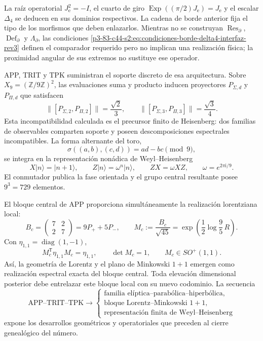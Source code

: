 \begin{remark}
La raíz operatorial \(J_{\mathrm e}^2=-I\), el cuarto de giro
\(\operatorname{Exp}((\pi/2)J_{\mathrm e})=J_{\mathrm e}\) y el escalar
\(\Delta_4\) se deducen en sus dominios respectivos. La cadena de borde
anterior fija el tipo de los morfismos que deben enlazarlos. Mientras no se
construyan
\(\operatorname{Res}_{\partial}\), \(\operatorname{Def}_{\partial}\) y
\(\Lambda_{\partial}\), las condiciones
\eqref{p3-83-c44-s2:eq:condiciones-borde-delta4-interfaz-rev3} definen el comparador
requerido pero no implican una realización física; la proximidad angular de
sus extremos no sustituye ese operador.
\end{remark}

APP, TRIT y TPK suministran el soporte discreto de esa arquitectura. Sobre
\(X_9=(\mathbb Z/9\mathbb Z)^2\), las evaluaciones suma y producto inducen
proyectores \(P_{\Sigma,d}\) y \(P_{\Pi,d}\) que satisfacen
\[
 \|[P_{\Sigma,2},P_{\Pi,2}]\|=\frac{\sqrt2}{3},
 \qquad
 \|[P_{\Sigma,3},P_{\Pi,3}]\|=\frac{\sqrt3}{4}.
\]
Esta incompatibilidad calculada es el precursor finito de Heisenberg: dos
familias de observables comparten soporte y poseen descomposiciones
espectrales incompatibles. La forma alternante del toro,
\[
 \sigma((a,b),(c,d))=ad-bc\pmod9,
\]
se integra en la representación nonádica de Weyl--Heisenberg
\[
 X|n\rangle=|n+1\rangle,\qquad
 Z|n\rangle=\omega^n|n\rangle,\qquad
 ZX=\omega XZ,
 \qquad \omega=e^{2\pi\mathrm i/9}.
\]
El conmutador publica la fase orientada y el grupo central resultante posee
\(9^3=729\) elementos.

El bloque central de APP proporciona simultáneamente la realización
lorentziana local:
\[
 B_c=
 \begin{pmatrix}7&2\\2&7\end{pmatrix}
 =9P_++5P_-,
 \qquad
 M_c:=\frac{B_c}{\sqrt{45}}
 =\exp\!\left(\frac12\log\frac95\,R\right).
\]
Con \(\eta_{1,1}=\operatorname{diag}(1,-1)\),
\[
 M_c^{\mathsf T}\eta_{1,1}M_c=\eta_{1,1},
 \qquad
 \det M_c=1,
 \qquad
 M_c\in SO^+(1,1).
\]
Así, la geometría de Lorentz y el plano de Minkowski \(1+1\) emergen como
realización espectral exacta del bloque central. Toda elevación dimensional
posterior debe entrelazar este bloque local con su nuevo codominio. La secuencia
\[
 \boxed{
 \text{APP--TRIT--TPK}
 \longrightarrow
 \begin{cases}
 \text{familia elíptica--parabólica--hiperbólica},\\
 \text{bloque Lorentz--Minkowski }1+1,\\
 \text{representación finita de Weyl--Heisenberg}
 \end{cases}}
\]
expone los desarrollos geométricos y operatoriales que preceden al cierre
genealógico del número.

